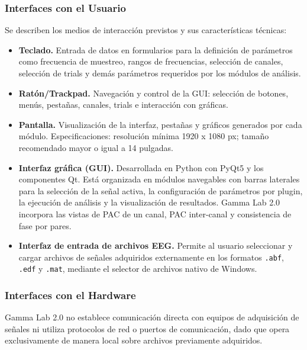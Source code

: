 \documentclass[12pt, letterpaper]{article}
\begin{document}
\subsubsection{Interfaces con el Usuario}

Se describen los medios de interacción previstos y sus características
técnicas:

\begin{itemize}

    \item \textbf{Teclado.} Entrada de datos en formularios para la
    definición de parámetros como frecuencia de muestreo, rangos de
    frecuencias, selección de canales, selección de trials y demás
    parámetros requeridos por los módulos de análisis.

    \item \textbf{Ratón/Trackpad.} Navegación y control de la GUI: selección
    de botones, menús, pestañas, canales, trials e interacción con gráficas.

    \item \textbf{Pantalla.} Visualización de la interfaz, pestañas y
    gráficos generados por cada módulo. Especificaciones: resolución mínima
    1920 x 1080 px; tamaño recomendado mayor o igual a 14 pulgadas.

    \item \textbf{Interfaz gráfica (GUI).} Desarrollada en Python con
    PyQt5 y los componentes Qt. Está organizada en módulos navegables con
    barras laterales para la selección de la señal activa, la configuración
    de parámetros por plugin, la ejecución de análisis y la visualización
    de resultados. Gamma Lab 2.0 incorpora las vistas de PAC de un canal, PAC
    inter-canal y consistencia de fase por pares.

    \item \textbf{Interfaz de entrada de archivos EEG.} Permite al usuario
    seleccionar y cargar archivos de señales adquiridos externamente en los
    formatos \texttt{.abf}, \texttt{.edf} y \texttt{.mat},
    mediante el selector de archivos nativo de Windows.

\end{itemize}

\subsubsection{Interfaces con el Hardware}

Gamma Lab 2.0 no establece comunicación directa con equipos de adquisición de
señales ni utiliza protocolos de red o puertos de comunicación, dado que
opera exclusivamente de manera local sobre archivos previamente adquiridos.
\end{document}
